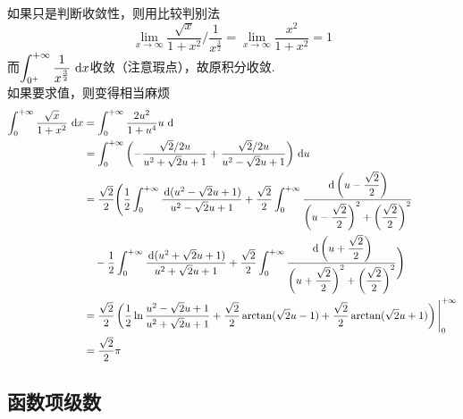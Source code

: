 \begin{analysis}
如果只是判断收敛性，则用比较判别法
\[\lim_{x\to\infty}\dfrac{\sqrt{x}}{1+x^2}\Big/\dfrac{1}{x^{\frac{3}{2}}}=\lim_{x\to\infty}\dfrac{x^2}{1+x^2}=1\]
而$\displaystyle\int_{0^+}^{+\infty}{\dfrac{1}{x^{\frac{3}{2}}}}\,\,\mathrm{d} x$收敛（注意瑕点），故原积分收敛.\\
如果要求值，则变得相当麻烦
\[\begin{aligned}
  \displaystyle\int_{0}^{+\infty}{\dfrac{\sqrt{x}}{1+x^2}}\,\,\mathrm{d} x
  &=\displaystyle\int_{0}^{+\infty}{\dfrac{2u^2}{1+u^4}{u}}\,\,\mathrm{d} \\
  &=\displaystyle\int_{0}^{+\infty}{\left(-\dfrac{\sqrt{2}/2u}{u^2+\sqrt{2}u+1}+\dfrac{\sqrt{2}/2u}{u^2-\sqrt{2}u+1}\right)}\,\,\mathrm{d} u\\
  &=\dfrac{\sqrt{2}}{2}\Bigg(\dfrac{1}{2}\int_0^{+\infty}\dfrac{\,\mathrm{d}(u^2-\sqrt{2}u+1)}{u^2-\sqrt{2}u+1}+\dfrac{\sqrt{2}}{2}\int_0^{+\infty}\dfrac{\,\mathrm{d}\left(u-\dfrac{\sqrt{2}}{2}\right)}{\left(u-\dfrac{\sqrt{2}}{2}\right)^2+\left(\dfrac{\sqrt{2}}{2}\right)^2}\\
  &\quad-\dfrac{1}{2}\int_0^{+\infty}\dfrac{\,\mathrm{d}(u^2+\sqrt{2}u+1)}{u^2+\sqrt{2}u+1}+\dfrac{\sqrt{2}}{2}\int_0^{+\infty}\dfrac{\,\mathrm{d}\left(u+\dfrac{\sqrt{2}}{2}\right)}{\left(u+\dfrac{\sqrt{2}}{2}\right)^2+\left(\dfrac{\sqrt{2}}{2}\right)^2}\Bigg)\\
  &=\dfrac{\sqrt{2}}{2}\left(\dfrac{1}{2}\ln\dfrac{u^2-\sqrt{2}u+1}{u^2+\sqrt{2}u+1}+\dfrac{\sqrt{2}}{2}\arctan(\sqrt{2}u-1)+\dfrac{\sqrt{2}}{2}\arctan(\sqrt{2}u+1)\right)\Bigg|_0^{+\infty}\\
  &=\dfrac{\sqrt{2}}{2}\pi                   
\end{aligned}\]
\end{analysis}

\subsection{函数项级数}
